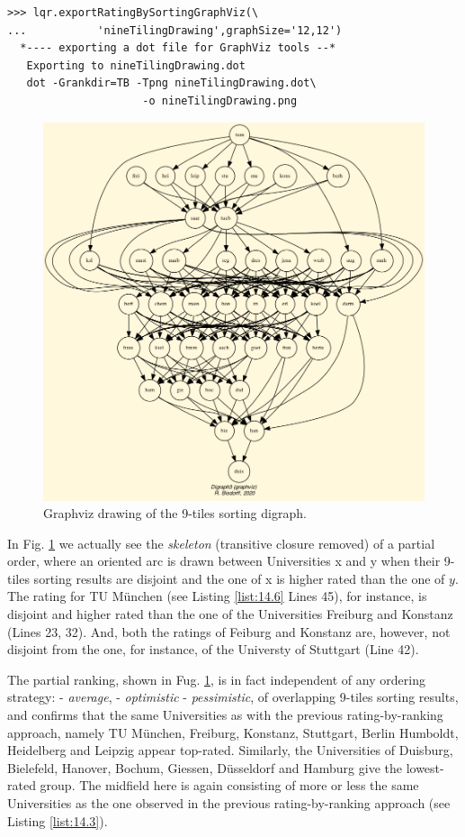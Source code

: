 \begin{lstlisting}
>>> lqr.exportRatingBySortingGraphViz(\
...           'nineTilingDrawing',graphSize='12,12')
  *---- exporting a dot file for GraphViz tools --*
   Exporting to nineTilingDrawing.dot
   dot -Grankdir=TB -Tpng nineTilingDrawing.dot\
                     -o nineTilingDrawing.png
\end{lstlisting}

\begin{figure}[h]
\includegraphics[width=12cm]{Figures/nineTilingDrawing.png}
\caption{Graphviz drawing of the 9-tiles sorting digraph.}
\label{fig:14.7}       %
\end{figure}

In Fig. \ref{fig:14.7} we actually see the \emph{skeleton} (transitive closure removed) of a partial order, where an oriented arc is drawn between Universities x and y when their 9-tiles sorting results are disjoint and the one of x is higher rated than the one of $y$. The rating for TU München (see Listing \ref{list:14.6} Lines 45), for instance, is disjoint and higher rated than the one of the Universities Freiburg and Konstanz (Lines 23, 32). And, both the ratings of Feiburg and Konstanz are, however, not disjoint from the one, for instance, of the Universty of Stuttgart (Line 42).

The partial ranking, shown in Fug. \ref{fig:14.7}, is in fact independent of any ordering strategy: - \emph{average}, - \emph{optimistic} - \emph{pessimistic}, of overlapping 9-tiles sorting results, and confirms that the same Universities as with the previous rating-by-ranking approach, namely TU München, Freiburg, Konstanz, Stuttgart, Berlin Humboldt, Heidelberg and Leipzig appear top-rated. Similarly, the Universities of Duisburg, Bielefeld, Hanover, Bochum, Giessen, Düsseldorf and Hamburg give the lowest-rated group. The midfield here is again consisting of more or less the same Universities as the one observed in the previous rating-by-ranking approach (see Listing \ref{list:14.3}).

